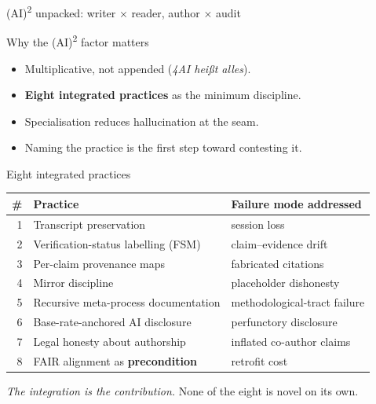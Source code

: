 \documentclass[aspectratio=169,11pt]{beamer}
\begin{document}
\begin{frame}{(AI)\textsuperscript{2} unpacked: writer $\times$ reader, author $\times$ audit}
  \begin{center}
    \resizebox{0.92\linewidth}{!}{}
  \end{center}
\end{frame}

\begin{frame}{Why the (AI)\textsuperscript{2} factor matters}
  \begin{itemize}
    \item Multiplicative, not appended (\emph{4AI hei{\ss}t alles}).
    \item \textbf{Eight integrated practices} as the minimum discipline.
    \item Specialisation reduces hallucination at the seam.
    \item Naming the practice is the first step toward contesting it.
  \end{itemize}
\end{frame}

\begin{frame}{Eight integrated practices}
  \footnotesize
  \begin{tabular}{rlp{4.4cm}}
    \toprule
    \# & Practice & Failure mode addressed \\
    \midrule
    1 & Transcript preservation             & session loss \\
    2 & Verification-status labelling (FSM) & claim--evidence drift \\
    3 & Per-claim provenance maps           & fabricated citations \\
    4 & Mirror discipline                   & placeholder dishonesty \\
    5 & Recursive meta-process documentation & methodological-tract failure \\
    6 & Base-rate-anchored AI disclosure    & perfunctory disclosure \\
    7 & Legal honesty about authorship      & inflated co-author claims \\
    8 & FAIR alignment as \textbf{precondition} & retrofit cost \\
    \bottomrule
  \end{tabular}

  \vspace{0.6em}
  \textit{The integration is the contribution.} None of the eight is novel on its own.
\end{frame}
\end{document}
